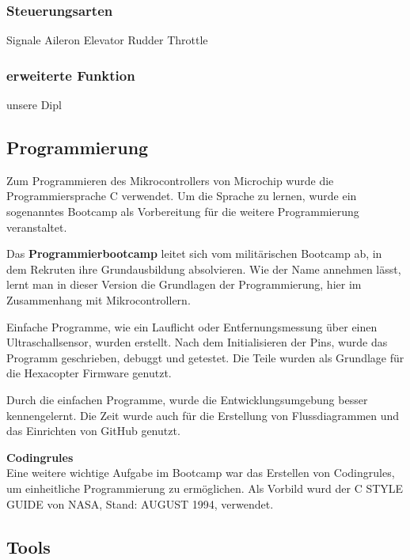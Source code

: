   \subsubsection{Steuerungsarten}
  Signale
  Aileron
  Elevator
  Rudder
  Throttle

  \cite{GrundlagenMulticopter}
  
  \subsubsection{erweiterte Funktion}
  unsere Dipl


  \subsection{Programmierung}
  Zum Programmieren des Mikrocontrollers von Microchip wurde die Programmiersprache C verwendet.
  Um die Sprache zu lernen, wurde ein sogenanntes Bootcamp als Vorbereitung für die weitere Programmierung veranstaltet.

  Das \textbf{Programmierbootcamp} leitet sich vom militärischen Bootcamp ab, in dem Rekruten ihre Grundausbildung absolvieren. Wie der Name annehmen lässt, lernt man in dieser Version die Grundlagen der Programmierung, hier im Zusammenhang mit Mikrocontrollern. 

  Einfache Programme, wie ein Lauflicht oder Entfernungsmessung über einen Ultraschallsensor, wurden erstellt.
  Nach dem Initialisieren der Pins, wurde das Programm geschrieben, debuggt und getestet. 
  Die Teile wurden als Grundlage für die Hexacopter Firmware genutzt.

  Durch die einfachen Programme, wurde die Entwicklungsumgebung besser kennengelernt. Die Zeit wurde auch für die Erstellung von Flussdiagrammen und das Einrichten von GitHub genutzt.

  \textbf{Codingrules}\\
  Eine weitere wichtige Aufgabe im Bootcamp war das Erstellen von Codingrules, um einheitliche Programmierung zu ermöglichen. 
  Als Vorbild wurd der C STYLE GUIDE von NASA, Stand: AUGUST 1994, verwendet. \cite{NasaCGuide}
  
  \subsection{Tools}


